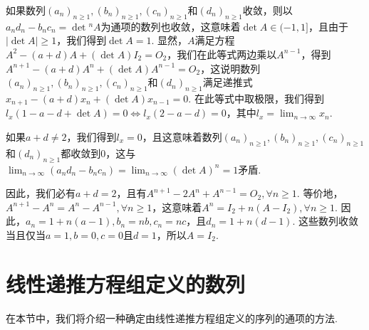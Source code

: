 \begin{solution}
  如果数列$(a_n)_{n\ge1},(b_n)_{n\ge1},(c_n)_{n\ge1}$和$(d_n)_{n\ge1}$收敛，则以$a_nd_n-b_nc_n=\det{}^nA$为通项的数列也收敛，这意味着$\det A\in(-1,1]$，且由于$|\det A|\ge1$，我们得到$\det A=1$. 显然，$A$满足方程$A^2-(a+d)A+(\det A)I_2=O_2$，我们在此等式两边乘以$A^{n-1}$，得到$A^{n+1}-(a+d)A^n+(\det A)A^{n-1}=O_2$，这说明数列$(a_n)_ {n\ge1},(b_n)_{n\ge1},(c_n)_{n\ge1}$和$(d_n)_{n\ge1}$满足递推式$x_{n+1}-(a+d)x_n+(\det A)x_{n-1}=0$. 在此等式中取极限，我们得到$l_x(1-a-d+\det A)=0\Leftrightarrow l_x(2-a-d)=0$，其中$l_x=\lim_{n\to\infty}x_n$.

  如果$a+d\ne2$，我们得到$l_x=0$，且这意味着数列$(a_n)_ {n\ge1},(b_n)_{n\ge1},(c_n)_{n\ge1}$和$(d_n)_{n\ge1}$都收敛到0，这与$\lim_{n\to\infty}(a_nd_n-b_nc_n)=\lim_{n\to\infty}(\det A)^n=1$矛盾.

  因此，我们必有$a+d=2$，且有$A^{n+1}-2A^n+A^{n-1}=O_2,\forall n\ge1$. 等价地，$A^{n+1}-A^n=A^n-A^{n-1},\forall n\ge1$，这意味着$A^n=I_2+n(A-I_2),\forall n\ge1$. 因此，$a_n=1+n(a-1),b_n=nb,c_n=nc$，且$d_n=1+n(d-1)$. 这些数列收敛当且仅当$a=1,b=0,c=0$且$d=1$，所以$A=I_2$.
\end{solution}

\section{线性递推方程组定义的数列}

在本节中，我们将介绍一种确定由线性递推方程组定义的序列的通项的方法.

